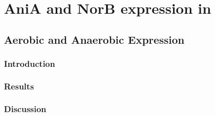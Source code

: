 \chapter{AniA and NorB expression in \Nm}
\section{Aerobic and Anaerobic Expression}
\subsection{Introduction}
\subsection{Results}
\subsection{Discussion}